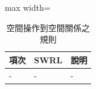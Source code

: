 \begin{table}[htbp]
\centering
\caption{空間操作到空間關係之規則}
\label{tab:soToSr}
\begin{adjustbox}{max width=\textwidth}
\renewcommand{\arraystretch}{1.4}
\begin{tabular}{>{\centering\arraybackslash}m{1cm} >{\centering\arraybackslash}m{3cm} >{\centering\arraybackslash}m{14cm} }
\toprule
項次 & SWRL & 說明 \\ 
\toprule
- & - & - \\ \midrule
\bottomrule
\end{tabular}
\end{adjustbox}
\end{table}